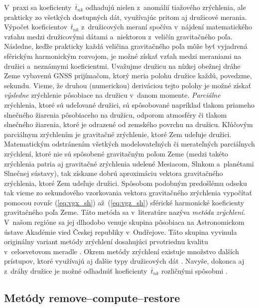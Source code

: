 \documentclass[a4paper, 12pt]{book}
\begin{document}
V~praxi sa koeficienty~$\bar{t}_{nk}$ odhadujú nielen z~anomálií tiažového 
zrýchlenia, ale prakticky zo všetkých dostupných dát, využívajúc pritom aj 
družicové merania.  Výpočet koeficientov~$\bar{t}_{nk}$ z~družicových meraní 
spočíva v~nájdení matematického vzťahu medzi družicovými dátami a~niektorou 
z~veličín gravitačného poľa.  Následne, keďže prakticky každá veličina 
gravitačného poľa môže byť vyjadrená sférickým harmonickým rozvojom, je možné 
získať vzťah medzi meraniami na družici a~neznámymi koeficientmi.  Uvažujme 
družicu na nízkej obežnej dráhe Zeme vybavenú GNSS prijímačom, ktorý meria 
polohu družice každú, povedzme, sekundu.  Vieme, že druhou (numerickou) 
deriváciou tejto polohy je možné získať \emph{výsledne} zrýchlenie pôsobiace na 
družicu v~danom momente.  \emph{Parciálne} zrýchlenia, ktoré sú udeľované 
družici, sú spôsobované napríklad tlakom priameho slnečného žiarenia 
pôsobiaceho na družicu, odporom atmosféry či tlakom slnečného žiarenia, ktoré 
je odrazené od zemského povrchu na družicu.  Kľúčovým parciálnym zrýchlením je 
gravitačné zrýchlenie, ktoré Zem udeľuje družici.  Matematickým odstránením 
všetkých modelovateľných či merateľných parciálnych zrýchlení, ktoré nie sú 
spôsobené gravitačným poľom Zeme (medzi takéto zrýchlenia patria aj gravitačné 
zrýchlenia udelené Mesiacom, Slnkom a~planétami Slnečnej sústavy), tak získame 
dobrú aproximáciu vektora gravitačného zrýchlenia, ktoré Zem udeľuje družici.  
Spôsobom podobným predošlému odseku tak vieme zo sekundového vzorkovania 
vektora gravitačného zrýchlenia vypočítať pomocou rovníc (\ref{eq:vgx_sh}) 
až~(\ref{eq:vgz_sh}) sférické harmonické koeficienty gravitačného poľa Zeme.  
Táto metóda sa v~literatúre nazýva \emph{metóda zrýchlení}.   V~našom regióne 
sa jej dlhodobo venuje skupina pôsobiaca na Astronomickom ústave Akadémie vied 
Českej republiky v~Ond\v{r}ejove.  Táto skupina vyvinula originálny variant 
metódy zrýchlení dosahujúci prvotriednu kvalitu v~celosvetovom meradle 
\parencite{Bezdek2014,encarnacao2020}.  Okrem metódy zrýchlení existuje 
množstvo ďalších prístupov, ktoré využívajú aj ďalšie typy družicových dát 
\parencite[pozri][]{SeeberSatelliteGeodesy}.  Navyše, dokonca aj z~dráhy 
družice je možné odhadnúť koeficienty~$\bar{t}_{nk}$ rozličnými spôsobmi 
\parencite[napríklad][]{Baur2014}.


\subsection{Metódy remove--compute--restore}
\end{document}
